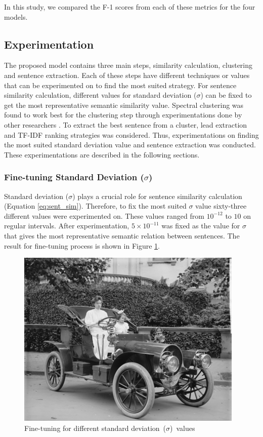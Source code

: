 \documentclass[acmlarge]{acmart}
\begin{document}
In this study, we compared the F-1 scores from each of these metrics for the four models.


\subsection{Experimentation}\label{subsec:experimentation}
The proposed model contains three main steps, similarity calculation, clustering and sentence extraction. Each of these steps have different techniques or values that can be experimented on to find the most suited strategy. For sentence similarity calculation, different values for standard deviation ($\sigma$) can be fixed to get the most representative semantic similarity value. Spectral clustering was found to work best for the clustering step through experimentations done by other researchers \cite{roychowdhury-etal-2022-spectral-base}. To extract the best sentence from a cluster, lead extraction and TF-IDF ranking strategies was considered. Thus, experimentations on finding the most suited standard deviation value and sentence extraction was conducted. These experimentations are described in the following sections.

\subsubsection{Fine-tuning Standard Deviation ($\sigma$)}\label{subsubsec:sigma}
Standard deviation ($\sigma$) plays a crucial role for sentence similarity calculation (Equation \ref{eq:sent_sim}). Therefore, to fix the most suited $\sigma$ value sixty-three different values were experimented on. These values ranged from $10^{-12}$ to $10$ on regular intervals. After experimentation, $5\times10^{-11}$ was fixed as the value for $\sigma$ that gives the most representative semantic relation between sentences. The result for fine-tuning process is shown in Figure \ref{fig:sigma-fine-tuning}.
\begin{figure}[h]
	\centering
	
	\includegraphics{sample-franklin}
	\caption{Fine-tuning for different standard deviation~($\sigma$)~values}
	\label{fig:sigma-fine-tuning}
\end{figure}
\end{document}
